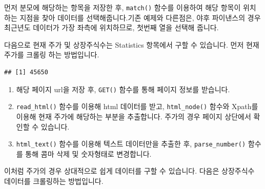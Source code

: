 \documentclass[12pt,]{book}
\newenvironment{Shaded}{\begin{snugshade}}{\end{snugshade}}
\newcommand{\DataTypeTok}[1]{\textcolor[rgb]{0.13,0.29,0.53}{#1}}
\newcommand{\KeywordTok}[1]{\textcolor[rgb]{0.13,0.29,0.53}{\textbf{#1}}}
\newcommand{\NormalTok}[1]{#1}
\newcommand{\OperatorTok}[1]{\textcolor[rgb]{0.81,0.36,0.00}{\textbf{#1}}}
\newcommand{\StringTok}[1]{\textcolor[rgb]{0.31,0.60,0.02}{#1}}
\providecommand{\tightlist}{%
  \setlength{\itemsep}{0pt}\setlength{\parskip}{0pt}}
\begin{document}
먼저 분모에 해당하는 항목을 저장한 후, \texttt{match()} 함수를 이용하여 해당 항목이 위치하는 지점을 찾아 데이터를 선택해줍니다.기존 예제와 다른점은, 야후 파이낸스의 경우 최근년도 데이터가 가장 좌측에 위치하므로, 첫번째 열을 선택해 줍니다.

다음으로 현재 주가 및 상장주식수는 Statistics 항목에서 구할 수 있습니다. 먼저 현재 주가를 크롤링 하는 방법입니다.

\begin{Shaded}
\end{Shaded}

\begin{verbatim}
## [1] 45650
\end{verbatim}

\begin{enumerate}
\def\labelenumi{\arabic{enumi}.}
\tightlist
\item
  해당 페이지 url을 저장 후, \texttt{GET()} 함수를 통해 페이지 정보를 받습니다.
\item
  \texttt{read\_html()} 함수를 이용해 html 데이터를 받고, \texttt{html\_node()} 함수와 Xpath를 이용해 현재 주가에 해당하는 부분을 추출합니다. 주가의 경우 페이지 상단에서 확인할 수 있습니다.
\item
  \texttt{html\_text()} 함수를 이용해 텍스트 데이터만을 추출한 후, \texttt{parse\_number()} 함수를 통해 콤마 삭제 및 숫자형태로 변경합니다.
\end{enumerate}

이처럼 주가의 경우 상대적으로 쉽게 데이터를 구할 수 있습니다. 다음은 상장주식수 데이터를 크롤링하는 방법입니다.
\end{document}
